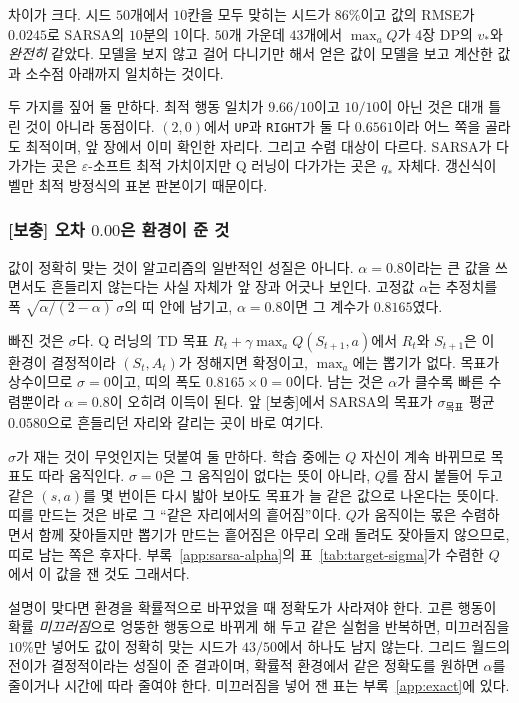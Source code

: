 \documentclass[11pt,a4paper]{article}
\begin{document}
차이가 크다. 시드 $50$개에서 $10$칸을 모두 맞히는 시드가 $86\%$이고 값의 RMSE가 $0.0245$로 SARSA의
$10$분의 $1$이다. $50$개 가운데 $43$개에서 $\max_a Q$가 4장 DP의 $v_*$와 \emph{완전히} 같았다.
모델을 보지 않고 걸어 다니기만 해서 얻은 값이 모델을 보고 계산한 값과 소수점 아래까지 일치하는
것이다.

두 가지를 짚어 둘 만하다. 최적 행동 일치가 $9.66/10$이고 $10/10$이 아닌 것은 대개 틀린 것이 아니라
동점이다. $(2,0)$에서 \texttt{UP}과 \texttt{RIGHT}가 둘 다 $0.6561$이라 어느 쪽을 골라도 최적이며,
앞 장에서 이미 확인한 자리다. 그리고 수렴 대상이 다르다. SARSA가 다가가는 곳은
$\varepsilon$-소프트 최적 가치이지만 Q 러닝이 다가가는 곳은 $q_*$ 자체다. 갱신식이 벨만 최적
방정식의 표본 판본이기 때문이다.

\subsubsection{[보충] 오차 \texorpdfstring{$0.00$}{0.00}은 환경이 준 것}
\label{sec:exact}

값이 정확히 맞는 것이 알고리즘의 일반적인 성질은 아니다. $\alpha=0.8$이라는 큰 값을 쓰면서도
흔들리지 않는다는 사실 자체가 앞 장과 어긋나 보인다. 고정값 $\alpha$는 추정치를 폭
$\sqrt{\alpha/(2-\alpha)}\,\sigma$의 띠 안에 남기고, $\alpha=0.8$이면 그 계수가 $0.8165$였다.

빠진 것은 $\sigma$다. Q 러닝의 TD 목표 $R_t + \gamma\max_a Q(S_{t+1},a)$에서 $R_t$와 $S_{t+1}$은
이 환경이 결정적이라 $(S_t,A_t)$가 정해지면 확정이고, $\max_a$에는 뽑기가 없다. 목표가 상수이므로
$\sigma = 0$이고, 띠의 폭도 $0.8165 \times 0 = 0$이다. 남는 것은 $\alpha$가 클수록 빠른 수렴뿐이라
$\alpha=0.8$이 오히려 이득이 된다. 앞 [보충]에서 SARSA의 목표가 $\sigma_{\text{목표}}$ 평균
$0.0580$으로 흔들리던 자리와 갈리는 곳이 바로 여기다.

$\sigma$가 재는 것이 무엇인지는 덧붙여 둘 만하다. 학습 중에는 $Q$ 자신이 계속 바뀌므로 목표도 따라
움직인다. $\sigma=0$은 그 움직임이 없다는 뜻이 아니라, $Q$를 잠시 붙들어 두고 같은 $(s,a)$를 몇
번이든 다시 밟아 보아도 목표가 늘 같은 값으로 나온다는 뜻이다. 띠를 만드는 것은 바로 그 ``같은
자리에서의 흩어짐''이다. $Q$가 움직이는 몫은 수렴하면서 함께 잦아들지만 뽑기가 만드는 흩어짐은
아무리 오래 돌려도 잦아들지 않으므로, 띠로 남는 쪽은 후자다.
부록~\ref{app:sarsa-alpha}의 표~\ref{tab:target-sigma}가 수렴한 $Q$에서 이 값을 잰 것도 그래서다.

설명이 맞다면 환경을 확률적으로 바꾸었을 때 정확도가 사라져야 한다. 고른 행동이 확률
\emph{미끄러짐}으로 엉뚱한 행동으로 바뀌게 해 두고 같은 실험을 반복하면, 미끄러짐을 $10\%$만 넣어도
값이 정확히 맞는 시드가 $43/50$에서 하나도 남지 않는다. 그리드 월드의 전이가 결정적이라는 성질이
준 결과이며, 확률적 환경에서 같은 정확도를 원하면 $\alpha$를 줄이거나 시간에 따라 줄여야 한다.
미끄러짐을 넣어 잰 표는 부록~\ref{app:exact}에 있다.
\end{document}
